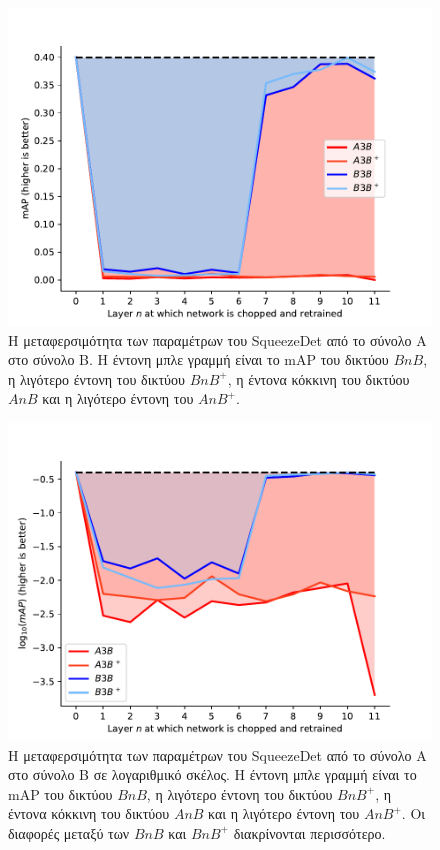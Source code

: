 \begin{figure}
\centering
\includegraphics[width=\textwidth]{figures/experiments/grantExp.pdf}
\caption[Η μεταφερσιμότητα των παραμέτρων του SqueezeDet από το σύνολο Α στο σύνολο Β]{Η μεταφερσιμότητα των παραμέτρων του SqueezeDet από το σύνολο Α στο σύνολο Β. Η έντονη μπλε γραμμή είναι το mAP του δικτύου $BnB$, η λιγότερο έντονη του δικτύου $BnB^+$, η έντονα κόκκινη του δικτύου $AnB$ και η λιγότερο έντονη του $AnB^+$.}
\label{fig:grantExpRes}
\end{figure}

\begin{figure}
\centering
\includegraphics[width=\textwidth]{figures/experiments/grantExpLog.pdf}
\caption[Η μεταφερσιμότητα των παραμέτρων του SqueezeDet από το σύνολο Α στο σύνολο Β σε λογαριθμικό σκέλος]{Η μεταφερσιμότητα των παραμέτρων του SqueezeDet από το σύνολο Α στο σύνολο Β σε λογαριθμικό σκέλος. Η έντονη μπλε γραμμή είναι το mAP του δικτύου $BnB$, η λιγότερο έντονη του δικτύου $BnB^+$, η έντονα κόκκινη του δικτύου $AnB$ και η λιγότερο έντονη του $AnB^+$. Οι διαφορές μεταξύ των $BnB$ και $BnB^+$ διακρίνονται περισσότερο. }
\label{fig:grantExpResLog}
\end{figure}


